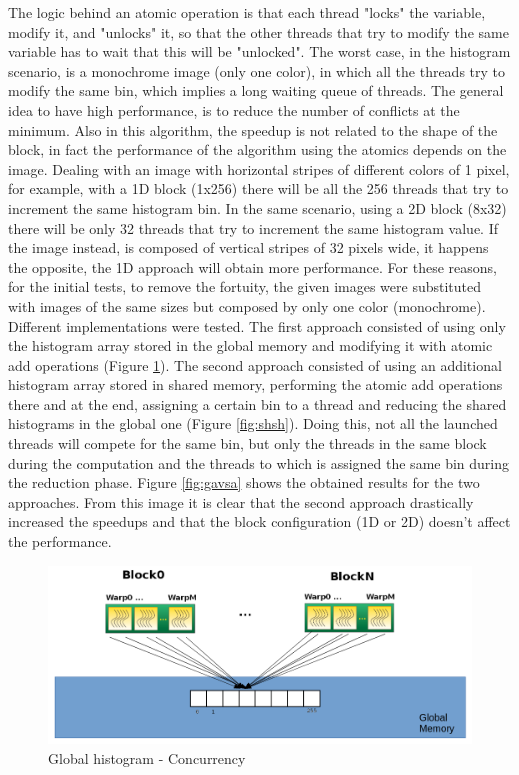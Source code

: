 \documentclass[a4paper]{article}
\begin{document}
The logic behind an atomic operation is that each thread "locks" the variable, modify it, and "unlocks" it, so that the other threads that try to modify the same variable has to wait that this will be "unlocked". The worst case, in the histogram scenario, is a monochrome image (only one color), in which all the threads try to modify the same bin, which implies a long waiting queue of threads. The general idea to have high performance, is to reduce the number of conflicts at the minimum. Also in this algorithm, the speedup is not related to the shape of the block, in fact the performance of the algorithm using the atomics depends on the image. Dealing with an image with horizontal stripes of different colors of 1 pixel, for example, with a 1D block (1x256) there will be all the 256 threads that try to increment the same histogram bin. In the same scenario, using a 2D block (8x32) there will be only 32 threads that try to increment the same histogram value. If the image instead, is composed of vertical stripes of 32 pixels wide, it happens the opposite, the 1D approach will obtain more performance. For these reasons, for the initial tests, to remove the fortuity, the given images were substituted with images of the same sizes but composed by only one color (monochrome). Different implementations were tested. The first approach consisted of using only the histogram array stored in the global memory and modifying it with atomic add operations (Figure \ref{fig:ghgh}). The second approach consisted of using an additional histogram array stored in shared memory, performing the atomic add operations there and at the end, assigning a certain bin to a thread and reducing the shared histograms in the global one (Figure \ref{fig:shsh}). Doing this, not all the launched threads will compete for the same bin, but only the threads in the same block during the computation and the threads to which is assigned the same bin during the reduction phase. Figure \ref{fig:gavsa} shows the obtained results for the two approaches. From this image it is clear that the second approach drastically increased the speedups and that the block configuration (1D or 2D) doesn't affect the performance.

\begin{figure}[!ht]
    \centering
    \includegraphics[width=0.7\linewidth]{global_histo}
    \caption{Global histogram - Concurrency}
    \label{fig:ghgh}
\end{figure}
\FloatBarrier
\end{document}

